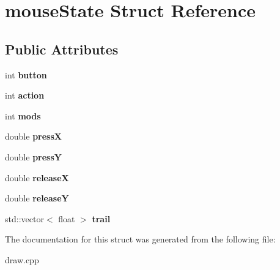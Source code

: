 \hypertarget{structmouseState}{}\section{mouse\+State Struct Reference}
\label{structmouseState}
\subsection*{Public Attributes}
\begin{DoxyCompactItemize}
\item 
int {\bfseries button}\hypertarget{structmouseState_ad7b696233423ae1521bd0ffb25e08e08}{}\label{structmouseState_ad7b696233423ae1521bd0ffb25e08e08}

\item 
int {\bfseries action}\hypertarget{structmouseState_a06766590be72bf39e95a95221777e94a}{}\label{structmouseState_a06766590be72bf39e95a95221777e94a}

\item 
int {\bfseries mods}\hypertarget{structmouseState_acf8c2b56c2d7eaf6268db0e197ddaa0f}{}\label{structmouseState_acf8c2b56c2d7eaf6268db0e197ddaa0f}

\item 
double {\bfseries pressX}\hypertarget{structmouseState_a99301fe5451bde2a6834ecb88a50ee1a}{}\label{structmouseState_a99301fe5451bde2a6834ecb88a50ee1a}

\item 
double {\bfseries pressY}\hypertarget{structmouseState_aa8676898357775a7f8206be9ddbe9d0b}{}\label{structmouseState_aa8676898357775a7f8206be9ddbe9d0b}

\item 
double {\bfseries releaseX}\hypertarget{structmouseState_aadc148c5aabe2c9478dbf5f73f1d28e5}{}\label{structmouseState_aadc148c5aabe2c9478dbf5f73f1d28e5}

\item 
double {\bfseries releaseY}\hypertarget{structmouseState_a6e70dfac836c4579a6bbe19300614b24}{}\label{structmouseState_a6e70dfac836c4579a6bbe19300614b24}

\item 
std\+::vector$<$ float $>$ {\bfseries trail}\hypertarget{structmouseState_a5e01043a7d69f90168473d967de30e5c}{}\label{structmouseState_a5e01043a7d69f90168473d967de30e5c}

\end{DoxyCompactItemize}


The documentation for this struct was generated from the following file\+:\begin{DoxyCompactItemize}
\item 
draw.\+cpp\end{DoxyCompactItemize}
